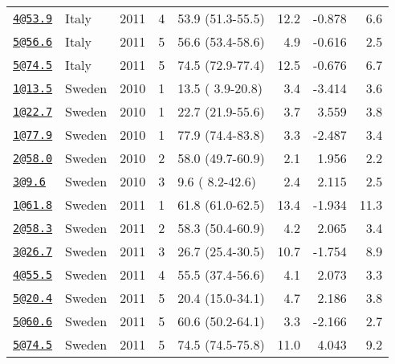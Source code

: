 \documentclass[
]{article}
\begin{document}
\begin{longtable}[]{@{}llrrlrrr@{}}
\href{mailto:4@53.9}{\nolinkurl{4@53.9}} & Italy & 2011 & 4 & 53.9 (51.3-55.5) & 12.2 & -0.878 & 6.6\tabularnewline
\href{mailto:5@56.6}{\nolinkurl{5@56.6}} & Italy & 2011 & 5 & 56.6 (53.4-58.6) & 4.9 & -0.616 & 2.5\tabularnewline
\href{mailto:5@74.5}{\nolinkurl{5@74.5}} & Italy & 2011 & 5 & 74.5 (72.9-77.4) & 12.5 & -0.676 & 6.7\tabularnewline
\href{mailto:1@13.5}{\nolinkurl{1@13.5}} & Sweden & 2010 & 1 & 13.5 ( 3.9-20.8) & 3.4 & -3.414 & 3.6\tabularnewline
\href{mailto:1@22.7}{\nolinkurl{1@22.7}} & Sweden & 2010 & 1 & 22.7 (21.9-55.6) & 3.7 & 3.559 & 3.8\tabularnewline
\href{mailto:1@77.9}{\nolinkurl{1@77.9}} & Sweden & 2010 & 1 & 77.9 (74.4-83.8) & 3.3 & -2.487 & 3.4\tabularnewline
\href{mailto:2@58.0}{\nolinkurl{2@58.0}} & Sweden & 2010 & 2 & 58.0 (49.7-60.9) & 2.1 & 1.956 & 2.2\tabularnewline
\href{mailto:3@9.6}{\nolinkurl{3@9.6}} & Sweden & 2010 & 3 & 9.6 ( 8.2-42.6) & 2.4 & 2.115 & 2.5\tabularnewline
\href{mailto:1@61.8}{\nolinkurl{1@61.8}} & Sweden & 2011 & 1 & 61.8 (61.0-62.5) & 13.4 & -1.934 & 11.3\tabularnewline
\href{mailto:2@58.3}{\nolinkurl{2@58.3}} & Sweden & 2011 & 2 & 58.3 (50.4-60.9) & 4.2 & 2.065 & 3.4\tabularnewline
\href{mailto:3@26.7}{\nolinkurl{3@26.7}} & Sweden & 2011 & 3 & 26.7 (25.4-30.5) & 10.7 & -1.754 & 8.9\tabularnewline
\href{mailto:4@55.5}{\nolinkurl{4@55.5}} & Sweden & 2011 & 4 & 55.5 (37.4-56.6) & 4.1 & 2.073 & 3.3\tabularnewline
\href{mailto:5@20.4}{\nolinkurl{5@20.4}} & Sweden & 2011 & 5 & 20.4 (15.0-34.1) & 4.7 & 2.186 & 3.8\tabularnewline
\href{mailto:5@60.6}{\nolinkurl{5@60.6}} & Sweden & 2011 & 5 & 60.6 (50.2-64.1) & 3.3 & -2.166 & 2.7\tabularnewline
\href{mailto:5@74.5}{\nolinkurl{5@74.5}} & Sweden & 2011 & 5 & 74.5 (74.5-75.8) & 11.0 & 4.043 & 9.2\tabularnewline
\bottomrule
\end{longtable}

\newpage
\end{document}
